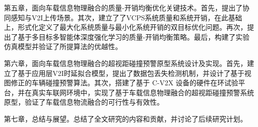 第五章，面向车载信息物理融合的质量-开销均衡优化关键技术。首先，提出了协同感知与V2I上传场景。其次，建立了了VCPS系统质量和系统开销，在此基础上，形式化定义了最大化系统质量与最小化系统开销的双目标优化问题。再次，提出了基于多目标多智能体深度强化学习的质量-开销均衡策略。最后，构建了实验仿真模型并验证了所提算法的优越性。

第六章，面向车载信息物理融合的超视距碰撞预警原型系统设计及实现。首先，建立了基于应用层V2I时延拟合模型，提出了数据包丢失检测机制，并设计了基于视图修正的车辆碰撞预警算法。其次，搭建了基于 C-V2X 设备的硬件在环试验平台，并在真实车联网环境中，实现了基于车载信息物理融合的超视距碰撞预警系统原型，验证了车载信息物流融合的可行性与有效性。

第七章，总结与展望。总结了全文研究的内容和贡献，并讨论了后续研究计划。






